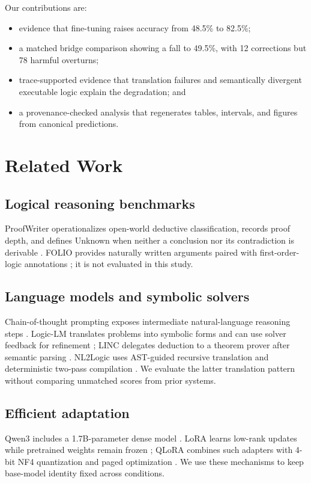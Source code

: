\documentclass[conference]{IEEEtran}
\begin{document}
Our contributions are:
\begin{itemize}
    \item evidence that fine-tuning raises accuracy from 48.5\% to 82.5\%;
    \item a matched bridge comparison showing a fall to 49.5\%, with 12 corrections but 78 harmful overturns;
    \item trace-supported evidence that translation failures and semantically divergent executable logic explain the degradation; and
    \item a provenance-checked analysis that regenerates tables, intervals, and figures from canonical predictions.
\end{itemize}

\section{Related Work}
\subsection{Logical reasoning benchmarks}
ProofWriter operationalizes open-world deductive classification, records proof depth, and defines Unknown when neither a conclusion nor its contradiction is derivable \cite{tafjord2021proofwriter}. FOLIO provides naturally written arguments paired with first-order-logic annotations \cite{han2022folio}; it is not evaluated in this study.

\subsection{Language models and symbolic solvers}
Chain-of-thought prompting exposes intermediate natural-language reasoning steps \cite{wei2022cot}. Logic-LM translates problems into symbolic forms and can use solver feedback for refinement \cite{pan2023logiclm}; LINC delegates deduction to a theorem prover after semantic parsing \cite{olausson2023linc}. NL2Logic uses AST-guided recursive translation and deterministic two-pass compilation \cite{putra2026nl2logic}. We evaluate the latter translation pattern without comparing unmatched scores from prior systems.

\subsection{Efficient adaptation}
Qwen3 includes a 1.7B-parameter dense model \cite{qwen2025qwen3}. LoRA learns low-rank updates while pretrained weights remain frozen \cite{hu2021lora}; QLoRA combines such adapters with 4-bit NF4 quantization and paged optimization \cite{dettmers2023qlora}. We use these mechanisms to keep base-model identity fixed across conditions.
\end{document}
